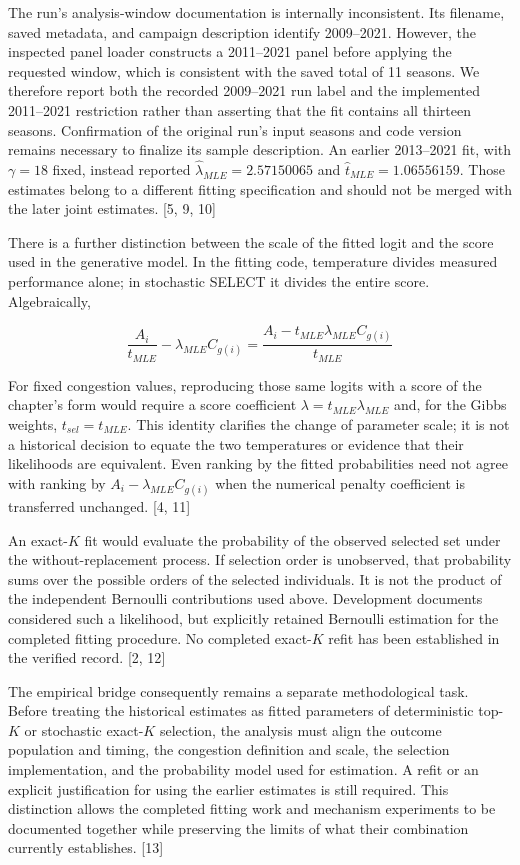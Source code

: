 The run's analysis-window documentation is internally inconsistent. Its filename, saved metadata, and campaign description identify 2009--2021. However, the inspected panel loader constructs a 2011--2021 panel before applying the requested window, which is consistent with the saved total of 11 seasons. We therefore report both the recorded 2009--2021 run label and the implemented 2011--2021 restriction rather than asserting that the fit contains all thirteen seasons. Confirmation of the original run's input seasons and code version remains necessary to finalize its sample description. An earlier 2013--2021 fit, with \(\gamma = 18\) fixed, instead reported \(\widehat{\lambda}_{MLE} = 2.57150065\) and \(\widehat{t}_{MLE} = 1.06556159\). Those estimates belong to a different fitting specification and should not be merged with the later joint estimates. {[}5, 9, 10{]}

There is a further distinction between the scale of the fitted logit and the score used in the generative model. In the fitting code, temperature divides measured performance alone; in stochastic SELECT it divides the entire score. Algebraically,

\[
\frac{A_{i}}{t_{MLE}} - \lambda_{MLE}C_{g(i)} = \frac{A_{i} - t_{MLE}\lambda_{MLE}C_{g(i)}}{t_{MLE}}
\]

For fixed congestion values, reproducing those same logits with a score of the chapter's form would require a score coefficient \(\lambda = t_{MLE}\lambda_{MLE}\) and, for the Gibbs weights, \(t_{sel} = t_{MLE}\). This identity clarifies the change of parameter scale; it is not a historical decision to equate the two temperatures or evidence that their likelihoods are equivalent. Even ranking by the fitted probabilities need not agree with ranking by \(A_{i} - \lambda_{MLE}C_{g(i)}\) when the numerical penalty coefficient is transferred unchanged. {[}4, 11{]}

An exact-\(K\) fit would evaluate the probability of the observed selected set under the without-replacement process. If selection order is unobserved, that probability sums over the possible orders of the selected individuals. It is not the product of the independent Bernoulli contributions used above. Development documents considered such a likelihood, but explicitly retained Bernoulli estimation for the completed fitting procedure. No completed exact-\(K\) refit has been established in the verified record. {[}2, 12{]}

The empirical bridge consequently remains a separate methodological task. Before treating the historical estimates as fitted parameters of deterministic top-\(K\) or stochastic exact-\(K\) selection, the analysis must align the outcome population and timing, the congestion definition and scale, the selection implementation, and the probability model used for estimation. A refit or an explicit justification for using the earlier estimates is still required. This distinction allows the completed fitting work and mechanism experiments to be documented together while preserving the limits of what their combination currently establishes. {[}13{]}


